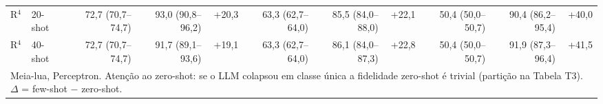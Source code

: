 \begin{table}[htbp]
\begin{tabular}{llrrrrrrrrr}
R$^4$ & 20-shot & 72,7 (70,7–74,7) & 93,0 (90,8–96,2) & +20,3 & 63,3 (62,7–64,0) & 85,5 (84,0–88,0) & +22,1 & 50,4 (50,0–50,7) & 90,4 (86,2–95,4) & +40,0 \\
R$^4$ & 40-shot & 72,7 (70,7–74,7) & 91,7 (89,1–93,6) & +19,1 & 63,3 (62,7–64,0) & 86,1 (84,0–87,3) & +22,8 & 50,4 (50,0–50,7) & 91,9 (87,3–96,4) & +41,5 \\
\bottomrule
\multicolumn{11}{p{0.95\linewidth}}{\footnotesize Meia-lua, Perceptron. Atenção ao zero-shot: se o LLM colapsou em classe única a fidelidade zero-shot é trivial (partição na Tabela T3). $\Delta$ = few-shot $-$ zero-shot.} \\
\end{tabular}
\end{table}
